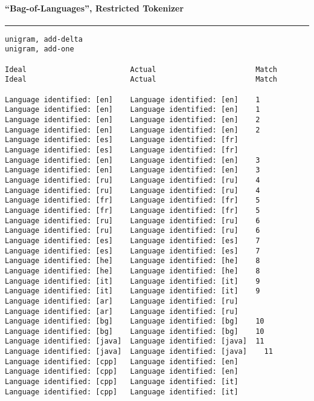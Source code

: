 \clearpage


\paragraph{``Bag-of-Languages'', Restricted Tokenizer}

\tiny
\hrule\vskip4pt
\begin{verbatim}
unigram, add-delta                                                unigram, add-one

Ideal                        Actual                       Match   Ideal                        Actual                       Match

Language identified: [en]    Language identified: [en]    1       Language identified: [en]    Language identified: [en]    1
Language identified: [en]    Language identified: [en]    2       Language identified: [en]    Language identified: [en]    2
Language identified: [es]    Language identified: [fr]            Language identified: [es]    Language identified: [fr]
Language identified: [en]    Language identified: [en]    3       Language identified: [en]    Language identified: [en]    3
Language identified: [ru]    Language identified: [ru]    4       Language identified: [ru]    Language identified: [ru]    4
Language identified: [fr]    Language identified: [fr]    5       Language identified: [fr]    Language identified: [fr]    5
Language identified: [ru]    Language identified: [ru]    6       Language identified: [ru]    Language identified: [ru]    6
Language identified: [es]    Language identified: [es]    7       Language identified: [es]    Language identified: [es]    7
Language identified: [he]    Language identified: [he]    8       Language identified: [he]    Language identified: [he]    8
Language identified: [it]    Language identified: [it]    9       Language identified: [it]    Language identified: [it]    9
Language identified: [ar]    Language identified: [ru]            Language identified: [ar]    Language identified: [ru]
Language identified: [bg]    Language identified: [bg]    10      Language identified: [bg]    Language identified: [bg]    10
Language identified: [java]  Language identified: [java]  11      Language identified: [java]  Language identified: [java]    11
Language identified: [cpp]   Language identified: [en]            Language identified: [cpp]   Language identified: [en]
Language identified: [cpp]   Language identified: [it]            Language identified: [cpp]   Language identified: [it]

\end{verbatim}
